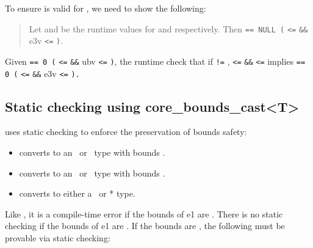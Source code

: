 To ensure  is
valid for , we need to show the following:

\begin{quote}
Let  and  be the runtime values for  and
 respectively. Then  \texttt{== NULL
\textbar{}\textbar{} (} \texttt{<=} 
\texttt{\&\&} e3v \texttt{<=} \texttt{)}.
\end{quote}

Given  \texttt{== 0 \textbar{}\textbar{} (}
\texttt{<=}  \texttt{\&\&} ubv \texttt{<=}
\texttt{)}, the runtime check that if  \texttt{!=}
,  \texttt{<=}  \texttt{\&\&}
 \texttt{<=}  implies 
\texttt{== 0 \textbar{}\textbar{} (} \texttt{<=}
 \texttt{\&\&} e3v \texttt{<=}
\texttt{).}

\subsection{Static checking using core\_bounds\_cast\textless{}T\textgreater{}}

uses static checking to enforce the preservation of bounds safety:

\begin{itemize}
\item
   converts  to an \arrayptr\ or
  \arrayview\ type with bounds
  .
\item
   converts  to an
  \arrayptr\ or \arrayview\ type with bounds
  .
\item
  converts  to either a \ptr\ or * type.
\end{itemize}

Like , it
is a compile-time error if the bounds of e1 are \boundsnone.
There is no static checking if the bounds of e1 are
\boundsany. If the bounds are , 
the following must be provable via static checking:

